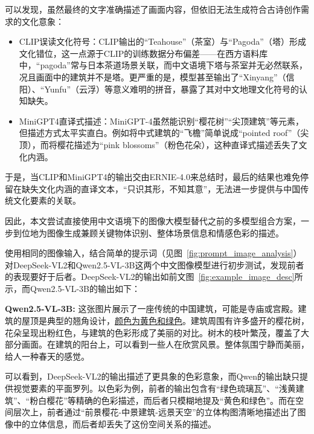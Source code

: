 可以发现，虽然最终的文字准确描述了画面内容，但依旧无法生成符合古诗创作需求的文化意象：
\begin{itemize}
  \item CLIP误读文化符号：CLIP输出的“Teahouse”（茶室）与“Pagoda”（塔）形成文化错位，这一点源于CLIP的训练数据分布偏差——在西方语料库中，“pagoda”常与日本茶道场景关联，而中文语境下塔与茶室并无必然联系，况且画面中的建筑并不是塔。更严重的是，模型甚至输出了“Xinyang”（信阳）、“Yunfu”（云浮）等意义难明的拼音，暴露了其对中文地理文化符号的认知缺失。
  \item MiniGPT4直译式描述：MiniGPT-4虽然能识别“樱花树”“尖顶建筑”等元素，但描述方式太平实直白。例如将中式建筑的“飞檐”简单说成“pointed roof”（尖顶），而将樱花描述为“pink blossoms”（粉色花朵），这种直译式描述丢失了文化内涵。
\end{itemize}

于是，当CLIP和MiniGPT4的输出交由ERNIE-4.0来总结时，最后的结果也难免停留在缺失文化内涵的直译文本，“只识其形，不知其意”，无法进一步提供与中国传统文化要素的关联。

因此，本文尝试直接使用中文语境下的图像大模型替代之前的多模型组合方案，一步到位地为图像生成兼顾关键物体识别、整体场景信息和情感色彩的描述。

使用相同的图像输入，结合简单的提示词（见图~\ref{fig:prompt_image_analysis}）对DeepSeek-VL2和Qwen2.5-VL-3B这两个中文图像模型进行初步测试，发现前者的表现要好于后者。DeepSeek-VL2的输出如前文图~\ref{fig:example_image_desc}所示，而Qwen2.5-VL-3B的输出如下：

{\kaishu 
\textbf{Qwen2.5-VL-3B:} 这张图片展示了一座传统的中国建筑，可能是寺庙或宫殿。建筑的屋顶是典型的翘角设计，\underline{颜色为黄色和绿色}。建筑周围有许多盛开的樱花树，花朵呈现出粉红色，与建筑的色彩形成了美丽的对比。树木的枝叶繁茂，覆盖了大部分画面。在建筑的阳台上，可以看到一些人在欣赏风景。整体氛围宁静而美丽，给人一种春天的感觉。\par
}

可以看到，DeepSeek-VL2的输出描述了更具象的色彩意象，而Qwen的输出缺只提供视觉要素的平面罗列。以色彩为例，前者的输出包含有“绿色琉璃瓦”、“浅黄建筑”、“粉白樱花”等精确的色彩描述，而后者只模糊地提及“黄色和绿色”。而在空间层次上，前者通过“前景樱花-中景建筑-远景天空”的立体构图清晰地描述出了图像中的立体信息，而后者却丢失了这份空间关系的描述。

